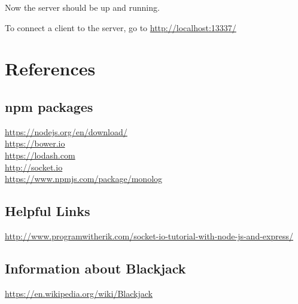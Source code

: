 \documentclass[a4paper]{article}
\begin{document}
Now the server should be up and running.

To connect a client to the server, go to \url{http://localhost:13337/}

\section{References}
\subsection*{npm packages}
\url{https://nodejs.org/en/download/}\\
\url{https://bower.io}\\
\url{https://lodash.com}\\
\url{http://socket.io}\\
\url{https://www.npmjs.com/package/monolog}\\

\subsection*{Helpful Links}
\url{http://www.programwitherik.com/socket-io-tutorial-with-node-js-and-express/}\\

\subsection*{Information about Blackjack}
\url{https://en.wikipedia.org/wiki/Blackjack}\\
	
\end{document}
